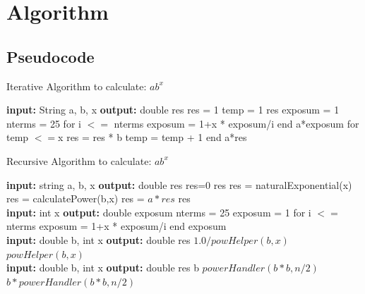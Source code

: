 \documentclass[a4paper,12pt]{report}
\begin{document}
\section{Algorithm}

\subsection{Pseudocode}

\begin{algorithm}
\caption{Iterative Algorithm to calculate: $ab^x$ }
\begin{algorithmic}
\State \textbf{input: } String a, b, x
\State \textbf{output: } double res
\State  res = 1
\State temp = 1
    \Return res
\Else
    \State exposum = 1
    \State nterms = 25
    \State for i $<=$ nterms
        \State exposum = 1+x * exposum/i
    \State end
\State \Return a*exposum
    \Else
        \State for temp $<=$x
            \State res = res * b
            \State temp = temp + 1
        \State end
        \State \Return a*res
        \EndIf
\EndIf
\EndProcedure
\end{algorithmic}
\end{algorithm}

\begin{algorithm}
\caption{Recursive Algorithm to calculate: $ab^x$ }
\begin{algorithmic}
\State \textbf{input: } string a, b, x
\State \textbf{output: } double res
\State  res=0
    \State \Return res
    \State res = naturalExponential(x)
\Else
 \State res = calculatePower(b,x)
\EndIf
\State res = $a * res$
\State \Return res
\EndProcedure
\\
\State \textbf{input: } int x
\State \textbf{output: } double exposum
\State nterms = 25
\State exposum = 1
\State for i $<=$ nterms
    \State exposum = 1+x * exposum/i
    \State end
\State \Return exposum
\EndProcedure
\\
\State \textbf{input: } double b, int x
\State \textbf{output: } double res
\State \Return $1.0/powHelper(b,x)$
   \EndIf
\State \Return $powHelper(b,x)$
\EndProcedure
\\
\State \textbf{input: } double b, int x
\State \textbf{output: } double res
\EndIf
{}
    \Return b
\EndIf
{}
\State \Return $powerHandler(b*b,  n/2)$
\Else
\State \Return $b * powerHandler(b*b,  n/2)$
\EndIf
\EndProcedure
\end{algorithmic}

\end{algorithm}
\end{document}
